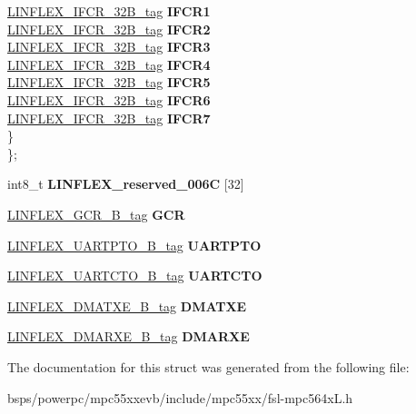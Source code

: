 \begin{DoxyCompactItemize}
\begin{tabbing}
\>\>\mbox{\hyperlink{unionLINFLEX__IFCR__32B__tag}{LINFLEX\_IFCR\_32B\_tag}} {\bfseries IFCR1}\\
\>\>\mbox{\hyperlink{unionLINFLEX__IFCR__32B__tag}{LINFLEX\_IFCR\_32B\_tag}} {\bfseries IFCR2}\\
\>\>\mbox{\hyperlink{unionLINFLEX__IFCR__32B__tag}{LINFLEX\_IFCR\_32B\_tag}} {\bfseries IFCR3}\\
\>\>\mbox{\hyperlink{unionLINFLEX__IFCR__32B__tag}{LINFLEX\_IFCR\_32B\_tag}} {\bfseries IFCR4}\\
\>\>\mbox{\hyperlink{unionLINFLEX__IFCR__32B__tag}{LINFLEX\_IFCR\_32B\_tag}} {\bfseries IFCR5}\\
\>\>\mbox{\hyperlink{unionLINFLEX__IFCR__32B__tag}{LINFLEX\_IFCR\_32B\_tag}} {\bfseries IFCR6}\\
\>\>\mbox{\hyperlink{unionLINFLEX__IFCR__32B__tag}{LINFLEX\_IFCR\_32B\_tag}} {\bfseries IFCR7}\\
\>\} \\
\}; \\

\end{tabbing}\item 
\mbox{\label{structLINFLEX__struct__tag_ad032b62d56303135ab26a1f1b082b13e}} 
int8\+\_\+t {\bfseries L\+I\+N\+F\+L\+E\+X\+\_\+reserved\+\_\+006C} \mbox{[}32\mbox{]}
\item 
\mbox{\label{structLINFLEX__struct__tag_a102e4b1a13ec9c88c26a3c771b0f0a96}} 
\mbox{\hyperlink{unionLINFLEX__GCR__32B__tag}{L\+I\+N\+F\+L\+E\+X\+\_\+\+G\+C\+R\+\_\+B\+\_\+tag}} {\bfseries G\+CR}
\item 
\mbox{\label{structLINFLEX__struct__tag_a7fc993de694dd3aa85c0d379c36f5eac}} 
\mbox{\hyperlink{unionLINFLEX__UARTPTO__32B__tag}{L\+I\+N\+F\+L\+E\+X\+\_\+\+U\+A\+R\+T\+P\+T\+O\+\_\+B\+\_\+tag}} {\bfseries U\+A\+R\+T\+P\+TO}
\item 
\mbox{\label{structLINFLEX__struct__tag_a6375ef89d99a835576a19370afa9d797}} 
\mbox{\hyperlink{unionLINFLEX__UARTCTO__32B__tag}{L\+I\+N\+F\+L\+E\+X\+\_\+\+U\+A\+R\+T\+C\+T\+O\+\_\+B\+\_\+tag}} {\bfseries U\+A\+R\+T\+C\+TO}
\item 
\mbox{\label{structLINFLEX__struct__tag_a6d5f342a50c4b733f84f868adf4e1198}} 
\mbox{\hyperlink{unionLINFLEX__DMATXE__32B__tag}{L\+I\+N\+F\+L\+E\+X\+\_\+\+D\+M\+A\+T\+X\+E\+\_\+B\+\_\+tag}} {\bfseries D\+M\+A\+T\+XE}
\item 
\mbox{\label{structLINFLEX__struct__tag_a9ec5116316ec3426ded2bf1a66eaa040}} 
\mbox{\hyperlink{unionLINFLEX__DMARXE__32B__tag}{L\+I\+N\+F\+L\+E\+X\+\_\+\+D\+M\+A\+R\+X\+E\+\_\+B\+\_\+tag}} {\bfseries D\+M\+A\+R\+XE}
\end{DoxyCompactItemize}


The documentation for this struct was generated from the following file\+:\begin{DoxyCompactItemize}
\item 
bsps/powerpc/mpc55xxevb/include/mpc55xx/fsl-\/mpc564x\+L.\+h\end{DoxyCompactItemize}
